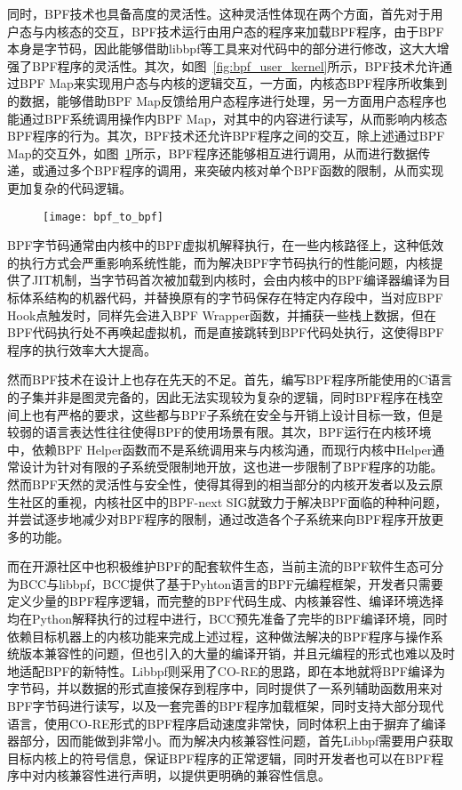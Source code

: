 同时，BPF技术也具备高度的灵活性。这种灵活性体现在两个方面，首先对于用户态与内核态的交互，BPF技术运行由用户态的程序来加载BPF程序，由于BPF本身是字节码，因此能够借助libbpf等工具来对代码中的部分进行修改，这大大增强了BPF程序的灵活性。其次，如图~\ref{fig:bpf_user_kernel}所示，BPF技术允许通过BPF Map来实现用户态与内核的逻辑交互，一方面，内核态BPF程序所收集到的数据，能够借助BPF Map反馈给用户态程序进行处理，另一方面用户态程序也能通过BPF系统调用操作内BPF Map，对其中的内容进行读写，从而影响内核态BPF程序的行为。其次，BPF技术还允许BPF程序之间的交互，除上述通过BPF Map的交互外，如图~\ref{fig:bpf_to_bpf}所示，BPF程序还能够相互进行调用，从而进行数据传递，或通过多个BPF程序的调用，来突破内核对单个BPF函数的限制，从而实现更加复杂的代码逻辑。

\begin{figure}[!htbp]
    \centering
    \texttt{[image: bpf\_to\_bpf]}
    \label{fig:bpf_to_bpf}
\end{figure}

BPF字节码通常由内核中的BPF虚拟机解释执行，在一些内核路径上，这种低效的执行方式会严重影响系统性能，而为解决BPF字节码执行的性能问题，内核提供了JIT机制，当字节码首次被加载到内核时，会由内核中的BPF编译器编译为目标体系结构的机器代码，并替换原有的字节码保存在特定内存段中，当对应BPF Hook点触发时，同样先会进入BPF Wrapper函数，并捕获一些栈上数据，但在BPF代码执行处不再唤起虚拟机，而是直接跳转到BPF代码处执行，这使得BPF程序的执行效率大大提高。

然而BPF技术在设计上也存在先天的不足。首先，编写BPF程序所能使用的C语言的子集并非是图灵完备的，因此无法实现较为复杂的逻辑，同时BPF程序在栈空间上也有严格的要求，这些都与BPF子系统在安全与开销上设计目标一致，但是较弱的语言表达性往往使得BPF的使用场景有限。其次，BPF运行在内核环境中，依赖BPF Helper函数而不是系统调用来与内核沟通，而现行内核中Helper通常设计为针对有限的子系统受限制地开放，这也进一步限制了BPF程序的功能。然而BPF天然的灵活性与安全性，使得其得到的相当部分的内核开发者以及云原生社区的重视，内核社区中的BPF-next SIG就致力于解决BPF面临的种种问题，并尝试逐步地减少对BPF程序的限制，通过改造各个子系统来向BPF程序开放更多的功能。

而在开源社区中也积极维护BPF的配套软件生态，当前主流的BPF软件生态可分为BCC\citep{bcc}与libbpf\citep{libbpf}，BCC提供了基于Pyhton语言的BPF元编程框架，开发者只需要定义少量的BPF程序逻辑，而完整的BPF代码生成、内核兼容性、编译环境选择均在Python解释执行的过程中进行，BCC预先准备了完毕的BPF编译环境，同时依赖目标机器上的内核功能来完成上述过程，这种做法解决的BPF程序与操作系统版本兼容性的问题，但也引入的大量的编译开销，并且元编程的形式也难以及时地适配BPF的新特性。Libbpf则采用了CO-RE的思路，即在本地就将BPF编译为字节码，并以数据的形式直接保存到程序中，同时提供了一系列辅助函数用来对BPF字节码进行读写，以及一套完善的BPF程序加载框架，同时支持大部分现代语言，使用CO-RE形式的BPF程序启动速度非常快，同时体积上由于摒弃了编译器部分，因而能做到非常小。而为解决内核兼容性问题，首先Libbpf需要用户获取目标内核上的符号信息，保证BPF程序的正常逻辑，同时开发者也可以在BPF程序中对内核兼容性进行声明，以提供更明确的兼容性信息。

